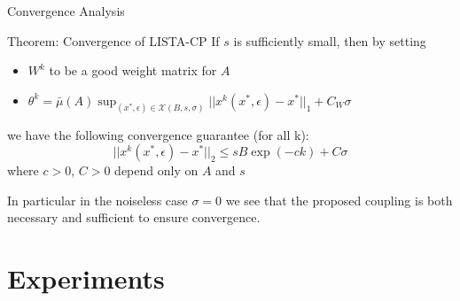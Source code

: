 \documentclass{beamer}
\begin{document}
\begin{frame}{Convergence Analysis}
\begin{block}{Theorem: Convergence of LISTA-CP}
If $s$ is sufficiently small, then by setting
\begin{itemize}
    \item $W^k$ to be a good weight matrix for $A$
    \item $\theta^k=\bar{\mu}(A)\sup_{(x^*,\epsilon)\in\mathcal{X}(B,s,\sigma)} ||x^k(x^*,\epsilon)-x^*||_1+C_W\sigma$
\end{itemize}
we have the following convergence guarantee (for all k):
\begin{equation*}
     ||x^k(x^*,\epsilon)-x^*||_2\leq sB\exp(-ck)+C\sigma
\end{equation*}
where $c>0$, $C>0$ depend only on $A$ and $s$



\end{block}
In particular in the noiseless case $\sigma=0$ we see that the proposed coupling is both necessary and sufficient to ensure convergence.
    
\end{frame}


\section{Experiments}
\end{document}
